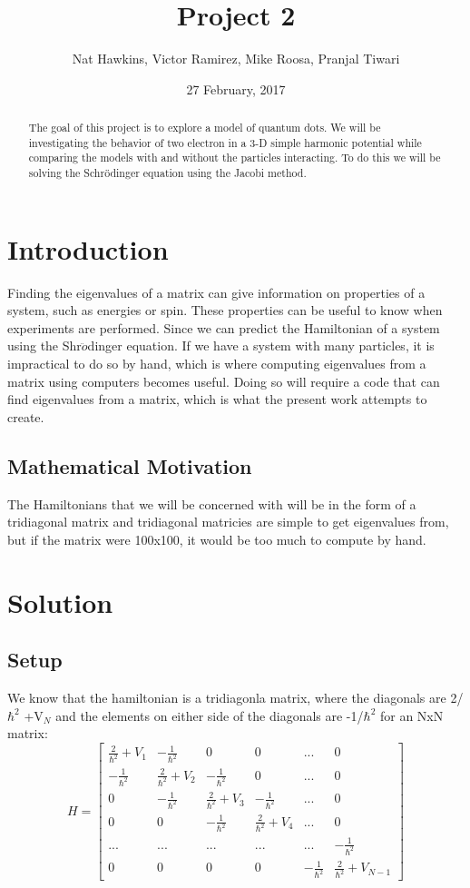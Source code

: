 \documentclass{article}
\title{Project 2}
\author{Nat Hawkins, Victor Ramirez, Mike Roosa, Pranjal Tiwari}
\date{27 February, 2017}
\begin{document}
\maketitle

\begin{abstract}
	The goal of this project is to explore a model of quantum dots. We will be investigating the behavior of two electron in a 3-D simple harmonic potential while comparing the models with and without the particles interacting. To do this we will be solving the Schrödinger equation using the Jacobi method. 
\end{abstract}

\section{Introduction}
Finding the eigenvalues of a matrix can give information on properties of a system, such as energies or spin. These properties can be useful to know when experiments are performed. Since we can predict the Hamiltonian of a system using the Shr$\ddot{o}$dinger equation. If we have a system with many particles, it is impractical to do so by hand, which is where computing eigenvalues from a matrix using computers becomes useful. Doing so will require a code that can find eigenvalues from a matrix, which is what the present work attempts to create.

\subsection{Mathematical Motivation}
The Hamiltonians that we will be concerned with will be in the form of a tridiagonal matrix and tridiagonal matricies are simple to get eigenvalues from, but if the matrix were 100x100, it would be too much to compute by hand.

\section{Solution}
\subsection{Setup}
We know that the hamiltonian is a tridiagonla matrix, where the diagonals are 2/$\hbar^2$ +V$_N$ and the elements on either side of the diagonals are -1/$\hbar^2$ for an NxN matrix:
\[
H=\begin{bmatrix}
\frac{2}{\hbar^2}+V_1 & -\frac{1}{\hbar^2}&0&0&...&0\\
 -\frac{1}{\hbar^2}&\frac{2}{\hbar^2}+V_2& -\frac{1}{\hbar^2}&0&...&0\\
0& -\frac{1}{\hbar^2}&\frac{2}{\hbar^2}+V_3& -\frac{1}{\hbar^2}&...&0\\
0&0&-\frac{1}{\hbar^2}&\frac{2}{\hbar^2}+V_4&...&0\\
...&...&...&...&...&-\frac{1}{\hbar^2}\\
0&0&0&0& -\frac{1}{\hbar^2}&\frac{2}{\hbar^2}+V_{N-1}
\end{bmatrix}
\]
\end{document}
